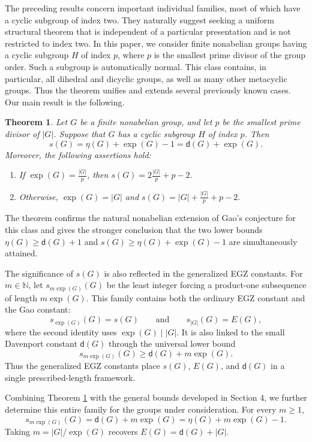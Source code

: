 \documentclass[a4paper, 12pt]{article}
\newtheorem{theorem}{Theorem}[section]
\theoremstyle{definition}
\begin{document}
The preceding results concern important individual families, most of
which have a cyclic subgroup of index two. They naturally suggest
seeking a uniform structural theorem that is independent of a
particular presentation and is not restricted to index two. In this paper, we
consider finite nonabelian groups having a cyclic subgroup $H$ of
index $p$, where $p$ is the smallest prime divisor of the group order.
Such a subgroup is automatically normal.
This class contains, in
particular, all dihedral and dicyclic groups, as well as many other
metacyclic groups. Thus the theorem unifies and extends several
previously known cases. Our main result is the following.




\begin{theorem}\label{theorem:main}
Let $G$ be a finite nonabelian group, and let $p$ be the smallest prime
divisor of $|G|$. Suppose that $G$ has a cyclic subgroup $H$ of index $p$.
Then $$s(G)=\eta(G)+\exp(G)-1=\mathsf d(G)+\exp(G).$$ Moreover, the following assertions hold:
\begin{enumerate}[label=\rm(\roman*)]
\item If $\exp(G)=\frac{|G|}{p}$, then
$s(G)=2\frac{|G|}{p}+p-2.$
\item Otherwise, $\exp(G)=|G|$ and
$s(G)=|G|+\frac{|G|}{p}+p-2.$
\end{enumerate}
\end{theorem}

The theorem confirms the natural nonabelian extension of Gao's
conjecture for this class and gives
the stronger conclusion that the two lower bounds
$\eta(G)\geq\mathsf d(G)+1$
and
$s(G)\geq\eta(G)+\exp(G)-1$
are simultaneously attained.



The significance of $s(G)$ is also reflected in the generalized EGZ
constants. For $m\in\mathbb N$, let $s_{m\exp(G)}(G)$ be the least
integer forcing a product-one subsequence of length $m\exp(G)$. This
family contains both the ordinary EGZ constant and the Gao constant:
$$s_{\exp(G)}(G)=s(G)
\qquad\text{and}\qquad
s_{|G|}(G)=E(G),$$
where the second identity uses $\exp(G)\mid |G|$. It is also linked to
the small Davenport constant $\mathsf d(G)$ through the universal
lower bound
$$s_{m\exp(G)}(G)\geq \mathsf d(G)+m\exp(G).$$
Thus the generalized EGZ constants place $s(G)$, $E(G)$, and
$\mathsf d(G)$ in a single prescribed-length framework.

Combining Theorem \ref{theorem:main} with the general bounds developed
in Section 4, we further determine this entire family for the groups
under consideration. For every $m\geq 1$,
$$s_{m\exp(G)}(G)
 =\mathsf d(G)+m\exp(G)
 =\eta(G)+m\exp(G)-1.$$
Taking $m=|G|/\exp(G)$ recovers
$E(G)=\mathsf d(G)+|G|$.
\end{document}
